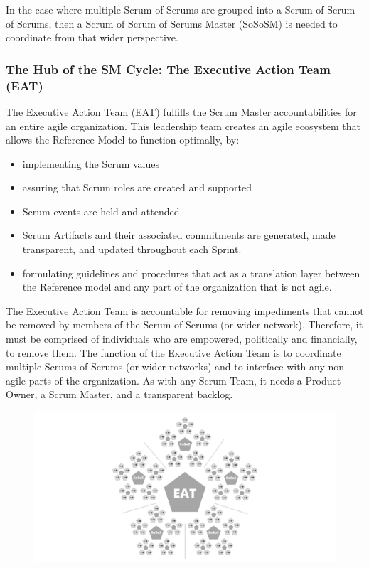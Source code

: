 \documentclass[12pt,a4paper,parskip=full]{scrartcl}
\begin{document}
In the case where multiple Scrum of Scrums are grouped into a Scrum of Scrum of Scrums, then a Scrum of Scrum of Scrums Master (SoSoSM) is needed to coordinate from that wider perspective.


\subsubsection{The Hub of the SM Cycle: The Executive Action Team
(EAT)}\label{the-hub-of-the-sm-cycle}

The Executive Action Team (EAT) fulfills the Scrum Master accountabilities for an entire agile organization. This leadership team creates an agile ecosystem that allows the Reference Model to function optimally, by:

\begin{itemize}
\itemsep1pt\parskip0pt
\item
  implementing the Scrum values
\item
  assuring that Scrum roles are created and supported
\item
  Scrum events are held and attended
\item
 Scrum Artifacts and their associated commitments are generated, made transparent, and updated throughout each Sprint.
\item
 formulating guidelines and procedures that act as a translation layer between the Reference model and any part of the organization that is not agile.
\end{itemize}

The Executive Action Team is accountable for removing impediments that cannot be removed by members of the Scrum of Scrums (or wider network). Therefore, it must be comprised of individuals who are empowered, politically and financially, to remove them. The function of the Executive Action Team is to coordinate multiple Scrums of Scrums (or wider networks) and to interface with any non-agile parts of the organization. As with any Scrum Team, it needs a Product Owner, a Scrum Master, and a transparent backlog.

\begin{figure}[H]
    \centering
    \includegraphics[scale=0.15]{3.png}
    
\end{figure}
\end{document}
